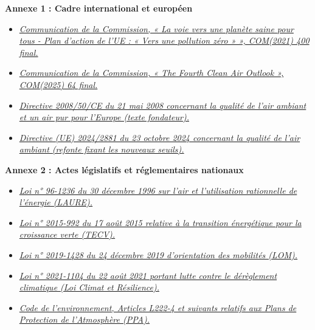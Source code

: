 \documentclass[12pt,a4paper]{article}
\begin{document}
\vspace{1.5cm}

\noindent\textbf{Annexe 1 : Cadre international et européen}
\vspace{0.3cm}
\begin{itemize}
    \item \textit{\href{https://eur-lex.europa.eu/legal-content/FR/TXT/?uri=CELEX:52021DC0400}{Communication de la Commission, « La voie vers une planète saine pour tous - Plan d'action de l'UE : « Vers une pollution zéro » », COM(2021) 400 final.}}
    \item \textit{\href{https://eur-lex.europa.eu/legal-content/EN/TXT/?uri=CELEX:52025DC0064}{Communication de la Commission, « The Fourth Clean Air Outlook », COM(2025) 64 final.}}
    \item \textit{\href{https://www.legifrance.gouv.fr/jorf/id/JORFTEXT000018984836/}{Directive 2008/50/CE du 21 mai 2008 concernant la qualité de l’air ambiant et un air pur pour l’Europe (texte fondateur).}}
    \item \textit{\href{https://eur-lex.europa.eu/legal-content/FR/TXT/?uri=CELEX:32024L2881}{Directive (UE) 2024/2881 du 23 octobre 2024 concernant la qualité de l'air ambiant (refonte fixant les nouveaux seuils).}}
\end{itemize}

\vspace{0.8cm}

\noindent\textbf{Annexe 2 : Actes législatifs et réglementaires nationaux}
\vspace{0.3cm}
\begin{itemize}
    \item \textit{\href{https://www.legifrance.gouv.fr/loda/id/JORFTEXT000000381337/}{Loi n° 96-1236 du 30 décembre 1996 sur l'air et l'utilisation rationnelle de l'énergie (LAURE).}}
    \item \textit{\href{https://www.legifrance.gouv.fr/loda/id/JORFTEXT000031044385/}{Loi n° 2015-992 du 17 août 2015 relative à la transition énergétique pour la croissance verte (TECV).}}
    \item \textit{\href{https://www.legifrance.gouv.fr/dossierlegislatif/JORFDOLE000037646678/}{Loi n° 2019-1428 du 24 décembre 2019 d'orientation des mobilités (LOM).}}
    \item \textit{\href{https://www.legifrance.gouv.fr/jorf/id/JORFTEXT000043956924}{Loi n° 2021-1104 du 22 août 2021 portant lutte contre le dérèglement climatique (Loi Climat et Résilience).}}
    \item \textit{\href{https://www.legifrance.gouv.fr/codes/section_lc/LEGITEXT000006074220/LEGISCTA000006176484/}{Code de l'environnement, Articles L222-4 et suivants relatifs aux Plans de Protection de l'Atmosphère (PPA).}}
\end{itemize}
\end{document}
